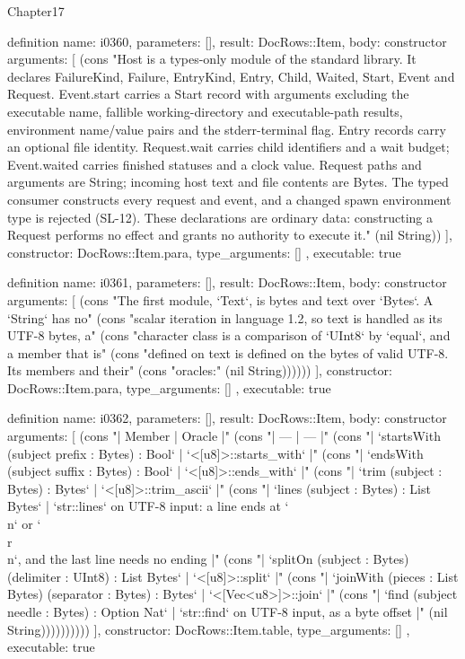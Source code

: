 \begin{lexlean}{Chapter17}
\begin{semanticmodule}
definition{
  name: i0360,
  parameters: [],
  result: DocRows::Item,
  body: constructor{
    arguments: [
      (cons "Host is a types-only module of the standard library. It declares FailureKind, Failure, EntryKind, Entry, Child, Waited, Start, Event and Request. Event.start carries a Start record with arguments excluding the executable name, fallible working-directory and executable-path results, environment name/value pairs and the stderr-terminal flag. Entry records carry an optional file identity. Request.wait carries child identifiers and a wait budget; Event.waited carries finished statuses and a clock value. Request paths and arguments are String; incoming host text and file contents are Bytes. The typed consumer constructs every request and event, and a changed spawn environment type is rejected (SL-12). These declarations are ordinary data: constructing a Request performs no effect and grants no authority to execute it." (nil String))
    ],
    constructor: DocRows::Item.para,
    type_arguments: []
  },
  executable: true
}

definition{
  name: i0361,
  parameters: [],
  result: DocRows::Item,
  body: constructor{
    arguments: [
      (cons "The first module, `Text`, is bytes and text over `Bytes`. A `String` has no" (cons "scalar iteration in language 1.2, so text is handled as its UTF-8 bytes, a" (cons "character class is a comparison of `UInt8` by `equal`, and a member that is" (cons "defined on text is defined on the bytes of valid UTF-8. Its members and their" (cons "oracles:" (nil String))))))
    ],
    constructor: DocRows::Item.para,
    type_arguments: []
  },
  executable: true
}

definition{
  name: i0362,
  parameters: [],
  result: DocRows::Item,
  body: constructor{
    arguments: [
      (cons "| Member | Oracle |" (cons "| --- | --- |" (cons "| `startsWith (subject prefix : Bytes) : Bool` | `<[u8]>::starts_with` |" (cons "| `endsWith (subject suffix : Bytes) : Bool` | `<[u8]>::ends_with` |" (cons "| `trim (subject : Bytes) : Bytes` | `<[u8]>::trim_ascii` |" (cons "| `lines (subject : Bytes) : List Bytes` | `str::lines` on UTF-8 input: a line ends at `\\n` or `\\r\\n`, and the last line needs no ending |" (cons "| `splitOn (subject : Bytes) (delimiter : UInt8) : List Bytes` | `<[u8]>::split` |" (cons "| `joinWith (pieces : List Bytes) (separator : Bytes) : Bytes` | `<[Vec<u8>]>::join` |" (cons "| `find (subject needle : Bytes) : Option Nat` | `str::find` on UTF-8 input, as a byte offset |" (nil String))))))))))
    ],
    constructor: DocRows::Item.table,
    type_arguments: []
  },
  executable: true
}


\end{semanticmodule}
\end{lexlean}
